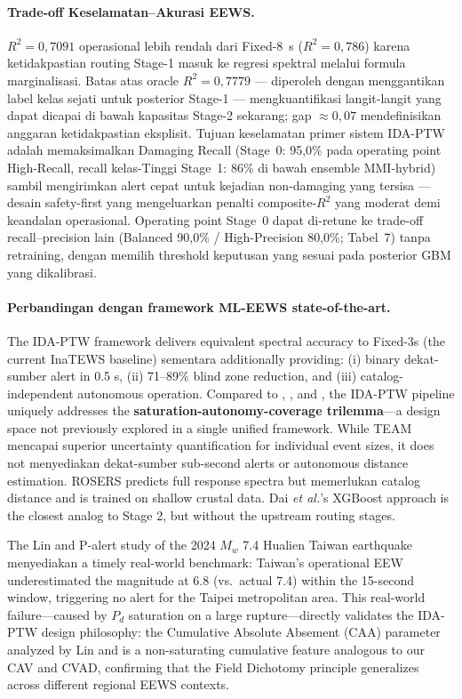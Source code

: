\documentclass[10pt]{article}
\renewcommand{\cite}[1]{\citep{#1}}
\newcommand{\etal}{\textit{et al.}}
\begin{document}
\paragraph{Trade-off Keselamatan--Akurasi EEWS.} \(R^2 = 0,7091\) operasional lebih rendah dari Fixed-8~s (\(R^2 = 0,786\)) karena ketidakpastian routing Stage-1 masuk ke regresi spektral melalui formula marginalisasi. Batas atas oracle \(R^2 = 0,7779\) --- diperoleh dengan menggantikan label kelas sejati untuk posterior Stage-1 --- mengkuantifikasi langit-langit yang dapat dicapai di bawah kapasitas Stage-2 sekarang; gap $\approx 0{,}07$ mendefinisikan anggaran ketidakpastian eksplisit. Tujuan keselamatan primer sistem IDA-PTW adalah memaksimalkan Damaging Recall (Stage~0: 95,0\% pada operating point High-Recall, recall kelas-Tinggi Stage~1: 86\% di bawah ensemble MMI-hybrid) sambil mengirimkan alert cepat untuk kejadian non-damaging yang tersisa --- desain safety-first yang mengeluarkan penalti composite-\(R^2\) yang moderat demi keandalan operasional. Operating point Stage~0 dapat di-retune ke trade-off recall--precision lain (Balanced 90,0\% / High-Precision 80,0\%; Tabel~7) tanpa retraining, dengan memilih threshold keputusan yang sesuai pada posterior GBM yang dikalibrasi.

\paragraph{Perbandingan dengan framework ML-EEWS state-of-the-art.} The IDA-PTW framework delivers equivalent spectral accuracy to Fixed-3s (the current InaTEWS baseline) sementara additionally providing: (i) binary dekat-sumber alert in 0.5 s, (ii) 71--89\% blind zone reduction, and (iii) catalog-independent autonomous operation. Compared to \citet{ref77}, \citet{ref32}, and \citet{ref35}, the IDA-PTW pipeline uniquely addresses the \textbf{saturation-autonomy-coverage trilemma}---a design space not previously explored in a single unified framework. While TEAM mencapai superior uncertainty quantification for individual event sizes, it does not menyediakan dekat-sumber sub-second alerts or autonomous distance estimation. ROSERS predicts full response spectra but memerlukan catalog distance and is trained on shallow crustal data. Dai \etal{}'s \cite{ref35} XGBoost approach is the closest analog to Stage 2, but without the upstream routing stages.

The Lin and \citet{ref85} P-alert study of the 2024 \(M_w\) 7.4 Hualien Taiwan earthquake menyediakan a timely real-world benchmark: Taiwan's operational EEW underestimated the magnitude at 6.8 (vs.~actual 7.4) within the 15-second window, triggering no alert for the Taipei metropolitan area. This real-world failure---caused by \(P_d\) saturation on a large rupture---directly validates the IDA-PTW design philosophy: the Cumulative Absolute Absement (CAA) parameter analyzed by Lin and \citet{ref85} is a non-saturating cumulative feature analogous to our CAV and CVAD, confirming that the Field Dichotomy principle generalizes across different regional EEWS contexts.
\end{document}
